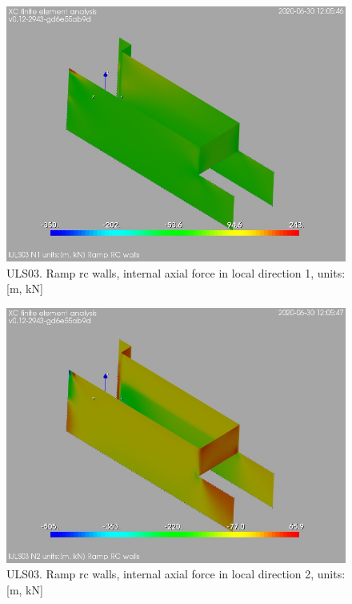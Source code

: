\begin{figure}
\begin{center}
\includegraphics[width=\linewidth]{ramp_wall/resLC/text/graphics/resSimplLC/lULS03wallsN1}
\caption{ULS03. Ramp rc walls, internal axial force in local direction 1, units:[m, kN]}
\end{center}
\end{figure}
\begin{figure}
\begin{center}
\includegraphics[width=\linewidth]{ramp_wall/resLC/text/graphics/resSimplLC/lULS03wallsN2}
\caption{ULS03. Ramp rc walls, internal axial force in local direction 2, units:[m, kN]}
\end{center}
\end{figure}
